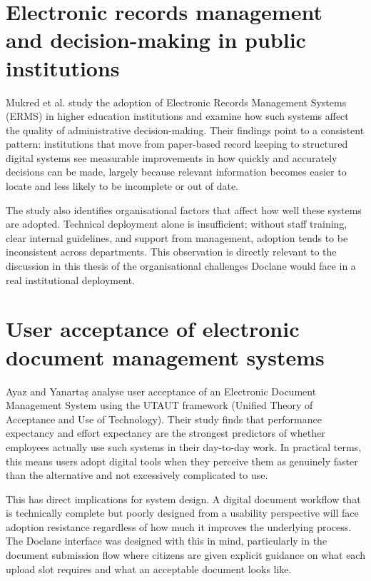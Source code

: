 
\section{Electronic records management and decision-making in public institutions}

\par Mukred et al. \cite{mukred2021} study the adoption of Electronic Records Management Systems (ERMS) in higher education institutions and examine how such systems affect the quality of administrative decision-making. Their findings point to a consistent pattern: institutions that move from paper-based record keeping to structured digital systems see measurable improvements in how quickly and accurately decisions can be made, largely because relevant information becomes easier to locate and less likely to be incomplete or out of date.

\par The study also identifies organisational factors that affect how well these systems are adopted. Technical deployment alone is insufficient; without staff training, clear internal guidelines, and support from management, adoption tends to be inconsistent across departments. This observation is directly relevant to the discussion in this thesis of the organisational challenges Doclane would face in a real institutional deployment.


\section{User acceptance of electronic document management systems}

\par Ayaz and Yanartaș \cite{ayaz2020} analyse user acceptance of an Electronic Document Management System using the UTAUT framework (Unified Theory of Acceptance and Use of Technology). Their study finds that performance expectancy and effort expectancy are the strongest predictors of whether employees actually use such systems in their day-to-day work. In practical terms, this means users adopt digital tools when they perceive them as genuinely faster than the alternative and not excessively complicated to use.

\par This has direct implications for system design. A digital document workflow that is technically complete but poorly designed from a usability perspective will face adoption resistance regardless of how much it improves the underlying process. The Doclane interface was designed with this in mind, particularly in the document submission flow where citizens are given explicit guidance on what each upload slot requires and what an acceptable document looks like.

